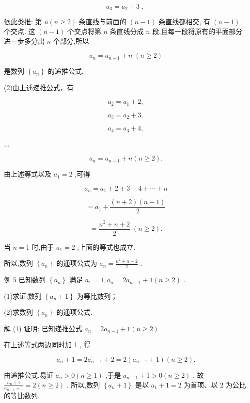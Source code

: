 \documentclass[10pt]{article}
\begin{document}
\[
{a}_{3} = {a}_{2} + 3\text{ . }
\]

依此类推: 第 \(n\left( {n \geq  2}\right)\) 条直线与前面的 \(\left( {n - 1}\right)\) 条直线都相交, 有 \(\left( {n - 1}\right)\) 个交点. 这 \(\left( {n - 1}\right)\) 个交点将第 \(n\) 条直线分成 \(n\) 段,且每一段将原有的平面部分进一步多分出 \(n\) 个部分,所以

\[
{a}_{n} = {a}_{n - 1} + n\;\left( {n \geq  2}\right)
\]

是数列 \(\left\{  {a}_{n}\right\}\) 的递推公式.

(2)由上述递推公式，有

\[
{a}_{2} = {a}_{1} + 2,
\]

\[
{a}_{3} = {a}_{2} + 3,
\]

\[
{a}_{4} = {a}_{3} + 4,
\]

...

\[
{a}_{n} = {a}_{n - 1} + n\left( {n \geq  2}\right) .
\]

由上述等式以及 \({a}_{1} = 2\) ,可得

\[
{a}_{n} = {a}_{1} + 2 + 3 + 4 + \cdots  + n
\]

\[
= {a}_{1} + \frac{\left( {n + 2}\right) \left( {n - 1}\right) }{2}
\]

\[
= \frac{{n}^{2} + n + 2}{2}\;\left( {n \geq  2}\right) .
\]

当 \(n = 1\) 时,由于 \({a}_{1} = 2\) ,上面的等式也成立.

所以,数列 \(\left\{  {a}_{n}\right\}\) 的通项公式为 \({a}_{n} = \frac{{n}^{2} + n + 2}{2}\) .

例 5 已知数列 \(\left\{  {a}_{n}\right\}\) 满足 \({a}_{1} = 1,{a}_{n} = 2{a}_{n - 1} + 1\left( {n \geq  2}\right)\) .

(1)求证:数列 \(\left\{  {{a}_{n} + 1}\right\}\) 为等比数列；

(2)求数列 \(\left\{  {a}_{n}\right\}\) 的通项公式.

解 (1) 证明: 已知递推公式 \({a}_{n} = 2{a}_{n - 1} + 1\left( {n \geq  2}\right)\) .

在上述等式两边同时加 1 , 得

\[
{a}_{n} + 1 = 2{a}_{n - 1} + 2 = 2\left( {{a}_{n - 1} + 1}\right) \left( {n \geq  2}\right) .
\]

由递推公式,易证 \({a}_{n} > 0\left( {n \geq  1}\right)\) ,于是 \({a}_{n - 1} + 1 > 0\left( {n \geq  2}\right)\) , 故 \(\frac{{a}_{n} + 1}{{a}_{n - 1} + 1} = 2\left( {n \geq  2}\right)\) . 所以,数列 \(\left\{  {{a}_{n} + 1}\right\}\) 是以 \({a}_{1} + 1 = 2\) 为首项、以 2 为公比的等比数列.
\end{document}
